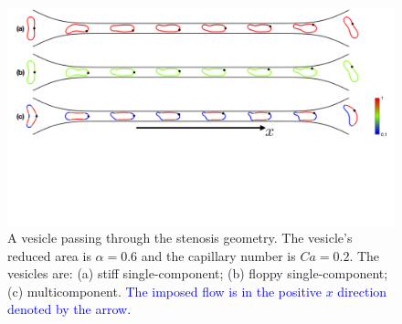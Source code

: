 \documentclass[twoside,twocolumn,9pt]{article}
\begin{document}
\begin{figure}[h]
  \centering
  \includegraphics[width=0.9\linewidth]{figures/STENOSIS_RAp6MCp5.pdf}
  \caption{\label{fig:RA6} \small A vesicle passing through the stenosis
  geometry. The vesicle's reduced area is $\alpha = 0.6$ and the
  capillary number is $Ca = 0.2$. The vesicles are: (a) stiff
  single-component; (b) floppy single-component; (c) multicomponent.
  \textcolor{blue}{The imposed flow is in the positive $x$ direction
  denoted by the arrow.}}
\end{figure}


\end{document}
